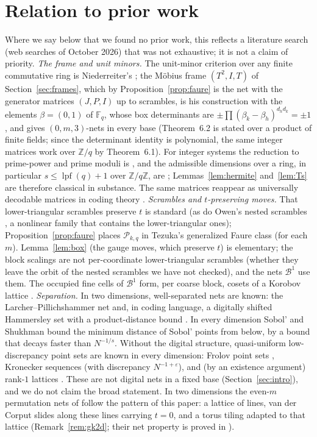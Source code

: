 \documentclass[11pt]{amsart}
\theoremstyle{definition}
\theoremstyle{plain}
\newcommand{\Z}{\mathbb{Z}}
\newcommand{\F}{\mathbb{F}}
\begin{document}
\section{Relation to prior work}\label{sec:prior}
Where we say below that we found no prior work, this reflects a literature search (web searches of October 2026) that was not exhaustive; it is not a claim of priority.
\emph{The frame and unit minors.} The unit-minor criterion over any finite commutative ring is Niederreiter's \cite[Thm.~6.1]{Nie87}; the M\"obius frame $(T^2,I,T)$ of Section~\ref{sec:frames}, which by Proposition~\ref{prop:faure} is the net with the generator matrices $(J,P,I)$ up to scrambles, is his construction \cite[Thm.~6.2]{Nie87} with the elements $\beta=(0,1)$ of $\F_q$, whose box determinants are $\pm\prod(\beta_k-\beta_h)^{d_hd_k}=\pm1$, and \cite[Cor.~6.3]{Nie87} gives $(0,m,3)$-nets in every base (Theorem~6.2 is stated over a product of finite fields; since the determinant identity is polynomial, the same integer matrices work over $\Z/q$ by Theorem~6.1). For integer systems the reduction to prime-power and prime moduli is \cite[Lemmas~8--9]{LNS96}, and the admissible dimensions over a ring, in particular $s\le\operatorname{lpf}(q)+1$ over $\Z/q\Z$, are \cite[Thm.~2, Cor.~2]{LNS96}; Lemmas~\ref{lem:hermite} and~\ref{lem:Ts} are therefore classical in substance. The same matrices reappear as universally decodable matrices in coding theory \cite{VG06}.
\emph{Scrambles and $t$-preserving moves.} That lower-triangular scrambles preserve $t$ is standard \cite{Mat98,Tez95,DP10} (as do Owen's nested scrambles \cite{Owe95}, a nonlinear family that contains the lower-triangular ones); Proposition~\ref{prop:faure} places $\mathcal P_{k,q}$ in Tezuka's generalized Faure class (for each $m$). Lemma~\ref{lem:box} (the gauge moves, which preserve $t$) is elementary; the block scalings are not per-coordinate lower-triangular scrambles (whether they leave the orbit of the nested scrambles we have not checked), and the nets $\mathcal B^1$ use them. The occupied fine cells of $\mathcal B^1$ form, per coarse block, cosets of a Korobov lattice \cite{Kor59,SJ94}.
\emph{Separation.} In two dimensions, well-separated nets are known: the Larcher--Pillichshammer net \cite{LP01,DGS2} and, in coding language, a digitally shifted Hammersley set with a product-distance bound \cite{TV06}. In every dimension Sobol' and Shukhman \cite{SS07} bound the minimum distance of Sobol' points from below, by a bound that decays faster than $N^{-1/s}$. Without the digital structure, quasi-uniform low-discrepancy point sets are known in every dimension: Frolov point sets \cite[Thm.~3.1]{DGLPS1}, Kronecker sequences \cite[Thm.~3.9 and the text after Cor.~3.13]{DGLPS1} (with discrepancy $N^{-1+\varepsilon}$), and (by an existence argument) rank-$1$ lattices \cite[Thm.~3.7]{DGLPS1}. These are not digital nets in a fixed base (Section~\ref{sec:intro}), and we do not claim the broad statement. In two dimensions the even-$m$ permutation nets of \cite[Sec.~3]{GK09} follow the pattern of this paper: a lattice of lines, van der Corput slides along these lines carrying $t=0$, and a torus tiling adapted to that lattice (Remark~\ref{rem:gk2d}; their net property is proved in \cite{Rud26}).
\end{document}
